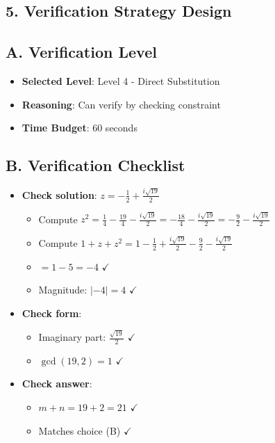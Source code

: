\documentclass[11pt]{article}
\begin{document}
\begin{verificationbox}
\section*{5. Verification Strategy Design}

\subsection*{A. Verification Level}
\begin{itemize}[leftmargin=*]
    \item \textbf{Selected Level}: Level 4 - Direct Substitution
    \item \textbf{Reasoning}: Can verify by checking constraint
    \item \textbf{Time Budget}: 60 seconds
\end{itemize}

\subsection*{B. Verification Checklist}
\begin{itemize}[leftmargin=*]
    \item \textbf{Check solution}: $z = -\frac{1}{2} + \frac{i\sqrt{19}}{2}$
    \begin{itemize}
        \item Compute $z^2 = \frac{1}{4} - \frac{19}{4} - \frac{i\sqrt{19}}{2} = -\frac{18}{4} - \frac{i\sqrt{19}}{2} = -\frac{9}{2} - \frac{i\sqrt{19}}{2}$
        \item Compute $1 + z + z^2 = 1 - \frac{1}{2} + \frac{i\sqrt{19}}{2} - \frac{9}{2} - \frac{i\sqrt{19}}{2}$
        \item $= 1 - 5 = -4$ $\checkmark$
        \item Magnitude: $|-4| = 4$ $\checkmark$
    \end{itemize}
    \item \textbf{Check form}:
    \begin{itemize}
        \item Imaginary part: $\frac{\sqrt{19}}{2}$ $\checkmark$
        \item $\gcd(19, 2) = 1$ $\checkmark$
    \end{itemize}
    \item \textbf{Check answer}:
    \begin{itemize}
        \item $m + n = 19 + 2 = 21$ $\checkmark$
        \item Matches choice (B) $\checkmark$
    \end{itemize}
\end{itemize}


\end{verificationbox}
\end{document}
